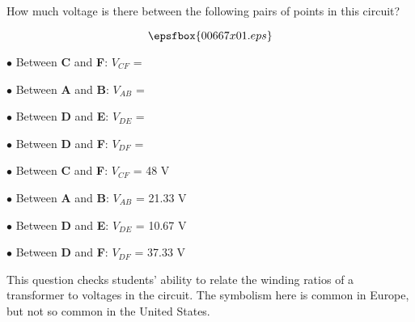

How much voltage is there between the following pairs of points in this circuit?

$$\epsfbox{00667x01.eps}$$

\medskip
\item{$\bullet$} Between {\bf C} and {\bf F}: $V_{CF}$ =
\item{$\bullet$} Between {\bf A} and {\bf B}: $V_{AB}$ =
\item{$\bullet$} Between {\bf D} and {\bf E}: $V_{DE}$ =
\item{$\bullet$} Between {\bf D} and {\bf F}: $V_{DF}$ =
\medskip







\medskip
\item{$\bullet$} Between {\bf C} and {\bf F}: $V_{CF}$ = 48 V
\item{$\bullet$} Between {\bf A} and {\bf B}: $V_{AB}$ = 21.33 V
\item{$\bullet$} Between {\bf D} and {\bf E}: $V_{DE}$ = 10.67 V
\item{$\bullet$} Between {\bf D} and {\bf F}: $V_{DF}$ = 37.33 V
\medskip







This question checks students' ability to relate the winding ratios of a transformer to voltages in the circuit.  The symbolism here is common in Europe, but not so common in the United States.




